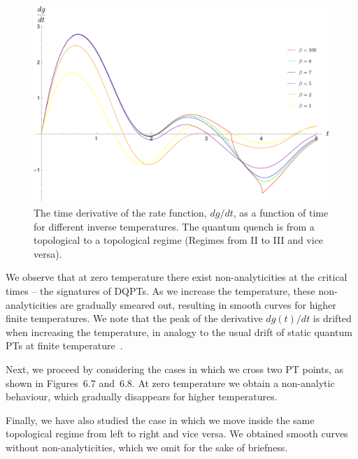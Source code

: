 \begin{figure}[h]    
\begin{center}
    \includegraphics[scale=0.3]{MDM_topo_+1_topo_-1.pdf}
    \caption{The time derivative of the rate function, $dg/dt$, as a function of time for different inverse temperatures. The quantum quench is from a topological to a topological regime (Regimes from II to III and vice versa).}\end{center}
    \label{fig:MDM-topo-+1-topo--1}

\end{figure}


We observe that at zero temperature  there exist non-analyticities at the critical times -- the signatures of DQPTs. As we increase the temperature, these non-analyticities are gradually smeared out, resulting in smooth curves for higher finite temperatures. We note that the peak of the derivative $dg(t)/dt$ is drifted when increasing the temperature, in analogy to the usual drift of static quantum PTs at finite temperature~\cite{kem:que:smi:16}.


Next, we proceed by considering the cases in which we cross two PT points, as shown in Figures~6.7 and~6.8. At zero temperature we obtain a non-analytic behaviour, which gradually disappears for higher temperatures.


Finally, we have also studied the case in which we move inside the same topological regime from left to right and vice versa. We obtained smooth curves without non-analyticities, which we omit for the sake of briefness.


